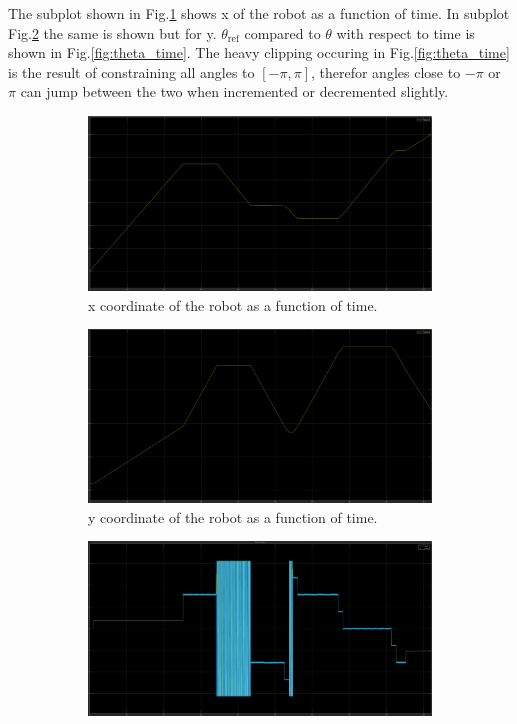 The subplot shown in Fig.\:\ref{fig:x_time} shows x of the robot as a function of time. In subplot Fig.\:\ref{fig:y_time} the same is shown but for y. $\theta_{\text{ref}}$ compared to $\theta$ with respect to time is shown in Fig.\:\ref{fig:theta_time}. The heavy clipping occuring in Fig.\:\ref{fig:theta_time} is the result of constraining all angles to $[-\pi, \pi]$, therefor angles close to $-\pi$ or $\pi$ can jump between the two when incremented or decremented slightly.
\begin{figure}
	\centering
    \begin{subfigure}[t]{0.32\columnwidth}
		\centering
		\includegraphics[width=\textwidth]{images/x_time.png}
		\caption{x coordinate of the robot as a function of time.}
        \label{fig:x_time}
	\end{subfigure}
    \hfill
	\begin{subfigure}[t]{0.32\columnwidth}
		\centering
		\includegraphics[width=\textwidth]{images/y_time.png}
		\caption{y coordinate of the robot as a function of time.}
        \label{fig:y_time}
	\end{subfigure}
    \hfill
    \begin{subfigure}[t]{0.32\columnwidth}
		\centering
		\includegraphics[width=\textwidth]{images/theta_time.png}

\end{subfigure}
\end{figure}
